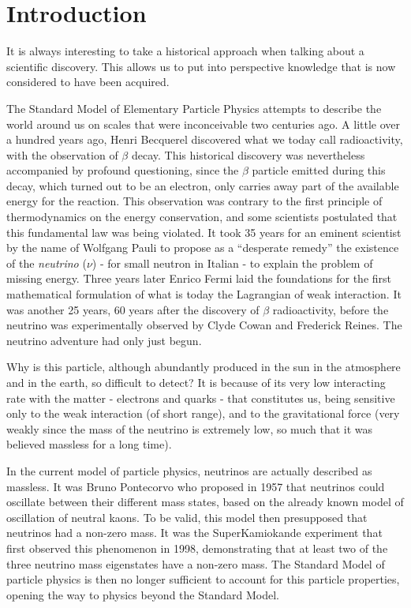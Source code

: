 \chapter*{Introduction}
\label{ch:intro}

It is always interesting to take a historical approach when talking about a scientific discovery. This allows us to put into perspective knowledge that is now considered to have been acquired.

The Standard Model of Elementary Particle Physics attempts to describe the world around us on scales that were inconceivable two centuries ago.
A little over a hundred years ago, Henri Becquerel discovered what we today call radioactivity, with the observation of $\beta$ decay.
This historical discovery was nevertheless accompanied by profound questioning, since the $\beta$ particle emitted during this decay, which turned out to be an electron, only carries away part of the available energy for the reaction.
This observation was contrary to the first principle of thermodynamics on the energy conservation, and some scientists postulated that this fundamental law was being violated.
It took 35 years for an eminent scientist by the name of Wolfgang Pauli to propose as a ``desperate remedy'' the existence of the \emph{neutrino} ($\nu$) - for small neutron in Italian - to explain the problem of missing energy.
Three years later Enrico Fermi laid the foundations for the first mathematical formulation of what is today the Lagrangian of weak interaction.
It was another 25 years, 60 years after the discovery of $\beta$ radioactivity, before the neutrino was experimentally observed by Clyde Cowan and Frederick Reines.
The neutrino adventure had only just begun.

Why is this particle, although abundantly produced in the sun in the atmosphere and in the earth, so difficult to detect?
It is because of its very low interacting rate with the matter - electrons and quarks - that constitutes us, being sensitive only to the weak interaction (of short range), and to the gravitational force (very weakly since the mass of the neutrino is extremely low, so much that it was believed massless for a long time).

In the current model of particle physics, neutrinos are actually described as massless.
It was Bruno Pontecorvo who proposed in 1957 that neutrinos could oscillate between their different mass states, based on the already known model of oscillation of neutral kaons.
To be valid, this model then presupposed that neutrinos had a non-zero mass.
It was the SuperKamiokande experiment that first observed this phenomenon in 1998, demonstrating that at least two of the three neutrino mass eigenstates have a non-zero mass.
The Standard Model of particle physics is then no longer sufficient to account for this particle properties, opening the way to physics beyond the Standard Model.

